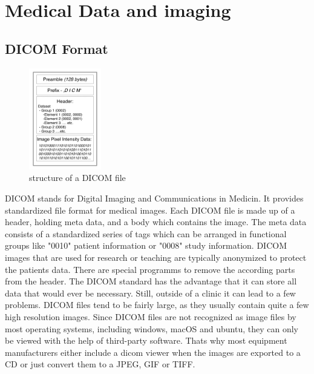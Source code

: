 \chapter{Medical Data and imaging}
    \label{Medical Data and imaging}
\section{DICOM Format}
\begin{figure}
    \vspace{-10pt}
    \centering
    \includegraphics[width=0.28\textwidth]{figures/dicom.jpeg}
    \caption{structure of a DICOM file }
        \label{figure 2.1}
    \vspace{-15pt}
\end{figure}
DICOM  stands for Digital Imaging and Communications in Medicin. It provides standardized file format for medical images. Each DICOM file is made up of a header, holding meta data, and a body which contains the image. The meta data consists of a standardized series of tags which can be arranged in functional groups like "0010" patient information or "0008" study information.
DICOM images that are used for research or teaching are typically anonymized to protect the patients data. There are special programms to remove the according parts from the header.
The DICOM standard has the advantage that it can store all data that would ever be necessary. Still, outside of a clinic it can lead to a few problems. DICOM files tend to be fairly large, as they usually contain quite a few high resolution images.
Since DICOM files are not recognized as image files by most operating systems, including windows, macOS and ubuntu, they can only be viewed with the help of third-party software.
Thats why most equipment manufacturers either include a dicom viewer when the images are exported to a CD or just convert them to a JPEG, GIF or TIFF.
\cite{varmaManagingDICOMImages2012}
 \cite{ElsevierEnhancedReader}

